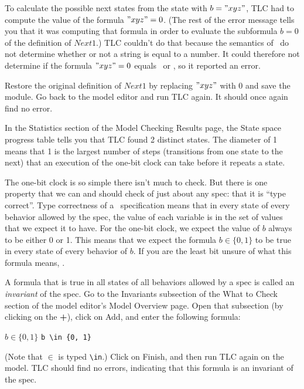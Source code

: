 \documentclass[fleqn,leqno]{article}
\begin{document}
To calculate the possible next states from the state with $b="xyz"$,
TLC had to compute the value of the formula $"xyz"=0$.  (The rest of
the error message tells you that it was computing that formula in
order to evaluate the subformula $b=0$ of the definition of $Next1$.)
TLC couldn't do that because the semantics of \tlaplus\ do not
determine whether or not a string is equal to a 
number.  It could
therefore not determine if the formula $"xyz"=0$ equals \TRUE\ or
\FALSE, so it reported an error. 

Restore the original definition of $Next1$ by replacing $"xyz"$ with 0
and save the module.  Go back to the model editor and run TLC again.
It should once again find no error.

\pause
%
\noindent 
%
In the \textsf{Statistics} section of the \textsf{Model Checking
Results} page, the \textsf{State space progress} table tells you that
TLC found 2 distinct states.  The diameter of 1 means that 1 is the
largest number of steps (transitions from one state to the next) that
an execution of the one-bit clock can take before it repeats a state.

The one-bit clock is so simple there isn't much to check.  But there
is one property that we can and should check of just about any spec:
that it is 
``type correct''.  Type correctness of a \tlaplus\ specification
means that in every state of every behavior allowed by the spec, the
value of each variable is in the set of values that we expect it to
have.  For the one-bit clock, we expect the value of $b$ always to be
either 0 or 1.  This means that we expect the formula $b\in\{0,1\}$ to
be true in every state of every behavior of $b$.  If you are the least
bit unsure of what this formula means,
\textsf{}.

A formula that is true in all states of all behaviors allowed by a
spec is called an 
\emph{invariant} of the spec.  Go to the
\textsf{Invariants} subsection of the \textsf{What to Check} section
of the model editor's \textsf{Model Overview} page.  Open
that subsection (by clicking on the {\bf \textsf{+}}), click on
\textsf{Add}, and enter the following formula:%
\begin{display}
\begin{twocols}
$b \in \{0, 1\}$
\midcol
\verb|b \in {0, 1}|
\end{twocols}
\end{display}
(Note that $\in$ is typed \verb|\in|.)  Click on \textsf{Finish}, and
then run TLC again on the model.  TLC should find no errors,
indicating that this formula is an invariant of the spec.
\end{document}
